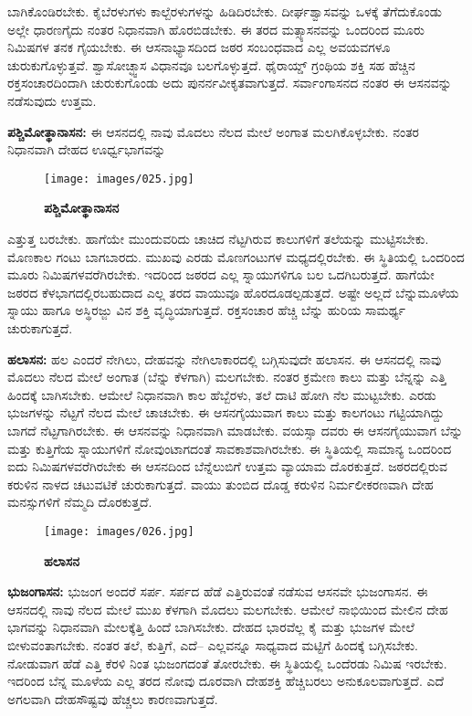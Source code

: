 ಬಾಗಿಕೊಂಡಿರಬೇಕು. ಕೈಬೆರಳುಗಳು ಕಾಲ್ಬೆರಳುಗಳನ್ನು ಹಿಡಿದಿರಬೇಕು. ದೀರ್ಘಶ್ವಾಸವನ್ನು ಒಳಕ್ಕೆ ತೆಗೆದುಕೊಂಡು ಅಲ್ಲೇ ಧಾರಣಗೈದು ನಂತರ ನಿಧಾನವಾಗಿ ಹೊರಬಿಡಬೇಕು. ಈ ತರದ ಮತ್ಸ್ಯಾಸನವನ್ನು ಒಂದರಿಂದ ಮೂರು ನಿಮಿಷಗಳ ತನಕ ಗೈಯಬೇಕು. ಈ ಆಸನಾಭ್ಯಾಸದಿಂದ ಜಠರ ಸಂಬಂಧವಾದ ಎಲ್ಲ ಅವಯವಗಳೂ ಚುರುಕುಗೊಳ್ಳುತ್ತವೆ. ಶ್ವಾಸೋಚ್ಛ್ವಾಸ ವಿಧಾನವೂ ಬಲಗೊಳ್ಳುತ್ತದೆ. ಥೈರಾಯ್ಡ್ ಗ್ರಂಥಿಯ ಶಕ್ತಿ ಸಹ ಹೆಚ್ಚಿನ ರಕ್ತಸಂಚಾರದಿಂದಾಗಿ ಚುರುಕುಗೊಂಡು ಅದು ಪುನರ್ನವೀಕೃತವಾಗುತ್ತದೆ. ಸರ್ವಾಂಗಾಸನದ ನಂತರ ಈ ಆಸನವನ್ನು ನಡೆಸುವುದು ಉತ್ತಮ.

\textbf{  ಪಶ್ಚಿಮೋತ್ಥಾನಾಸನ:} ಈ ಆಸನದಲ್ಲಿ ನಾವು ಮೊದಲು ನೆಲದ ಮೇಲೆ ಅಂಗಾತ ಮಲಗಿಕೊಳ್ಳಬೇಕು. ನಂತರ ನಿಧಾನವಾಗಿ ದೇಹದ ಊರ್ಧ್ವಭಾಗವನ್ನು

\begin{figure}
\texttt{[image: images/025.jpg]}
\caption{\textbf{ಪಶ್ಚಿಮೋತ್ಥಾನಾಸನ} }
\end{figure}

ಎತ್ತುತ್ತ ಬರಬೇಕು. ಹಾಗೆಯೇ ಮುಂದುವರಿದು ಚಾಚಿದ ನೆಟ್ಟಗಿರುವ ಕಾಲುಗಳಿಗೆ ತಲೆಯನ್ನು ಮುಟ್ಟಿಸಬೇಕು. ಮೊಣಕಾಲ ಗಂಟು ಬಾಗಬಾರದು. ಮುಖವು ಎರಡು ಮೊಣಗಂಟುಗಳ ಮಧ್ಯದಲ್ಲಿರಬೇಕು. ಈ ಸ್ಥಿತಿಯಲ್ಲಿ ಒಂದರಿಂದ ಮೂರು ನಿಮಿಷಗಳವರೆಗಿರಬೇಕು. ಇದರಿಂದ ಜಠರದ ಎಲ್ಲ ಸ್ನಾಯುಗಳಿಗೂ ಬಲ ಒದಗಿಬರುತ್ತದೆ. ಹಾಗೆಯೇ ಜಠರದ ಕೆಳಭಾಗದಲ್ಲಿರಬಹುದಾದ ಎಲ್ಲ ತರದ ವಾಯುವೂ  ಹೊರದೂಡಲ್ಪಡುತ್ತದೆ. ಅಷ್ಟೇ ಅಲ್ಲದೆ ಬೆನ್ನುಮೂಳೆಯ ಸ್ನಾಯು ಹಾಗೂ ಅಸ್ಥಿರಜ್ಜು  ವಿನ ಶಕ್ತಿ ವೃದ್ಧಿಯಾಗುತ್ತದೆ. ರಕ್ತಸಂಚಾರ ಹೆಚ್ಚಿ ಬೆನ್ನು ಹುರಿಯ ಸಾಮರ್ಥ್ಯ ಚುರುಕಾಗುತ್ತದೆ.

\textbf{  ಹಲಾಸನ:} ಹಲ ಎಂದರೆ ನೇಗಿಲು, ದೇಹವನ್ನು ನೇಗಿಲಾಕಾರದಲ್ಲಿ ಬಗ್ಗಿಸುವುದೇ ಹಲಾಸನ. ಈ ಆಸನದಲ್ಲಿ ನಾವು ಮೊದಲು ನೆಲದ ಮೇಲೆ ಅಂಗಾತ (ಬೆನ್ನು ಕೆಳಗಾಗಿ) ಮಲಗಬೇಕು. ನಂತರ ಕ್ರಮೇಣ ಕಾಲು ಮತ್ತು ಬೆನ್ನನ್ನು ಎತ್ತಿ ಹಿಂದಕ್ಕೆ ಬಾಗಿಸಬೇಕು. ಆಮೇಲೆ ನಿಧಾನವಾಗಿ ಕಾಲ ಹೆಬ್ಬೆರಳು, ತಲೆ ದಾಟಿ ಹೋಗಿ ನೆಲ ಮುಟ್ಟಬೇಕು. ಎರಡು ಭುಜಗಳನ್ನು ನೆಟ್ಟಗೆ ನೆಲದ ಮೇಲೆ ಚಾಚಬೇಕು. ಈ ಆಸನಗೈಯುವಾಗ ಕಾಲು ಮತ್ತು ಕಾಲಗಂಟು ಗಟ್ಟಿಯಾಗಿದ್ದು ಬಾಗದೆ ನೆಟ್ಟಗಾಗಿರಬೇಕು. ಈ ಆಸನವನ್ನು ನಿಧಾನವಾಗಿ ಮಾಡಬೇಕು. ವಯಸ್ಸಾ ದವರು ಈ ಆಸನಗೈಯುವಾಗ ಬೆನ್ನು ಮತ್ತು ಕುತ್ತಿಗೆಯ ಸ್ನಾಯುಗಳಿಗೆ ನೋವುಂಟಾಗದಂತೆ ಸಾವಕಾಶವಾಗಿರಬೇಕು. ಈ ಸ್ಥಿತಿಯಲ್ಲಿ ಸಾಮಾನ್ಯ ಒಂದರಿಂದ ಐದು ನಿಮಿಷಗಳವರೆಗಿರಬೇಕು ಈ ಆಸನದಿಂದ ಬೆನ್ನೆಲುಬಿಗೆ ಉತ್ತಮ ವ್ಯಾಯಾಮ ದೊರಕುತ್ತದೆ. ಜಠರದಲ್ಲಿರುವ ಕರುಳಿನ ನಾಳದ ಚಟುವಟಿಕೆ ಚುರುಕಾಗುತ್ತದೆ. ವಾಯು ತುಂಬಿದ ದೊಡ್ಡ ಕರುಳಿನ ನಿರ್ಮಲೀಕರಣವಾಗಿ ದೇಹ ಮನಸ್ಸುಗಳಿಗೆ ನೆಮ್ಮದಿ ದೊರಕುತ್ತದೆ.

\begin{figure}
\texttt{[image: images/026.jpg]}
\caption{\textbf{ಹಲಾಸನ} }
\end{figure}

\textbf{  ಭುಜಂಗಾಸನ:} ಭುಜಂಗ ಅಂದರೆ ಸರ್ಪ. ಸರ್ಪದ ಹೆಡೆ ಎತ್ತಿರುವಂತೆ ನಡೆಸುವ ಆಸನವೇ ಭುಜಂಗಾಸನ. ಈ ಆಸನದಲ್ಲಿ ನಾವು ನೆಲದ ಮೇಲೆ ಮುಖ ಕೆಳಗಾಗಿ ಮೊದಲು ಮಲಗಬೇಕು. ಆಮೇಲೆ ನಾಭಿಯಿಂದ ಮೇಲಿನ ದೇಹ ಭಾಗವನ್ನು ನಿಧಾನವಾಗಿ ಮೇಲಕ್ಕೆತ್ತಿ ಹಿಂದೆ ಬಾಗಿಸಬೇಕು. ದೇಹದ ಭಾರವೆಲ್ಲ ಕೈ ಮತ್ತು ಭುಜಗಳ ಮೇಲೆ ಬೀಳುವಂತಾಗಬೇಕು. ನಂತರ ತಲೆ, ಕುತ್ತಿಗೆ, ಎದೆ– ಎಲ್ಲವನ್ನೂ ಸಾಧ್ಯವಾದ ಮಟ್ಟಿಗೆ ಹಿಂದಕ್ಕೆ ಬಗ್ಗಿಸಬೇಕು. ನೋಡುವಾಗ ಹೆಡೆ ಎತ್ತಿ ಕೆರಳಿ ನಿಂತ ಭುಜಂಗದಂತೆ ತೋರಬೇಕು. ಈ ಸ್ಥಿತಿಯಲ್ಲಿ ಒಂದೆರಡು ನಿಮಿಷ ಇರಬೇಕು. ಇದರಿಂದ ಬೆನ್ನ ಮೂಳೆಯ ಎಲ್ಲ ತರದ ನೋವು ದೂರವಾಗಿ ದೇಹಶಕ್ತಿ ಹೆಚ್ಚಿಬರಲು ಅನುಕೂಲವಾಗುತ್ತದೆ. ಎದೆ ಅಗಲವಾಗಿ ದೇಹಸೌಷ್ಟವು ಹೆಚ್ಚಲು ಕಾರಣವಾಗುತ್ತದೆ.

